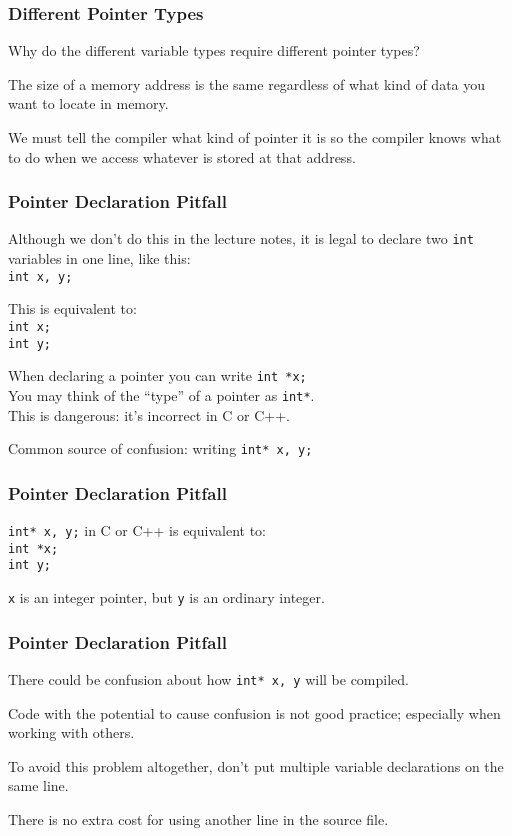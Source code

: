 \begin{frame}
\frametitle{Different Pointer Types}
Why do the different variable types require different pointer types?

The size of a memory address is the same regardless of what kind of data you want to locate in memory.

We must tell the compiler what kind of pointer it is so the compiler knows what to do when we access whatever is stored at that address.

\end{frame}

\begin{frame}
\frametitle{Pointer Declaration Pitfall}
Although we don't do this in the lecture notes, it is legal to declare two \texttt{int} variables in one line, like this:\\
\quad \texttt{int x, y;}

This is equivalent to:\\
\quad \texttt{int x;}\\
\quad \texttt{int y;}

When declaring a pointer you can write \texttt{int *x;}\\
\quad You may think of the ``type'' of a pointer as \texttt{int*}.\\
\quad This is dangerous: it's incorrect in C or C++.

Common source of confusion: writing \texttt{int* x, y;}

\end{frame}

\begin{frame}
\frametitle{Pointer Declaration Pitfall}
\texttt{int* x, y;} in C or C++ is equivalent to:\\
\quad \texttt{int *x;}\\
\quad \texttt{int y;}

\texttt{x} is an integer pointer, but \texttt{y} is an ordinary integer.\\

\end{frame}

\begin{frame}
\frametitle{Pointer Declaration Pitfall}
There could be confusion about how \texttt{int* x, y} will be compiled.


Code with the potential to cause confusion is not good practice; especially when working with others.


To avoid this problem altogether, don't put multiple variable declarations on the same line.

There is no extra cost for using another line in the source file.

\end{frame}


